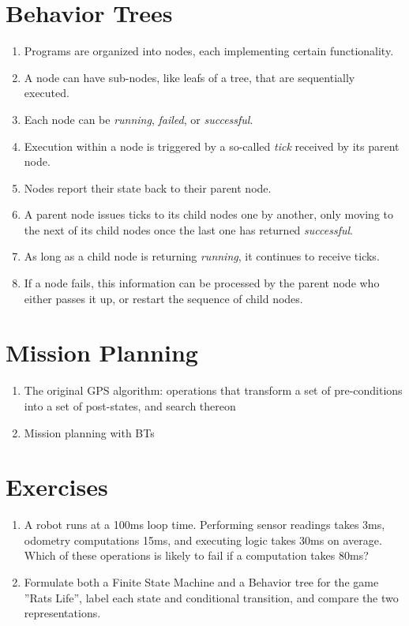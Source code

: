 \section{Behavior Trees}
\begin{enumerate}
\item Programs are organized into nodes, each implementing certain functionality.
\item A node can have sub-nodes, like leafs of a tree, that are sequentially executed.
\item Each node can be \emph{running}, \emph{failed}, or \emph{successful}.
\item Execution within a node is triggered by a so-called \emph{tick} received by its parent node.
\item Nodes report their state back to their parent node.
\item A parent node issues ticks to its child nodes one by another, only moving to the next of its child nodes once the last one has returned \emph{successful}.
\item As long as a child node is returning \emph{running}, it continues to receive ticks.
\item If a node fails, this information can be processed by the parent node who either passes it up, or restart the sequence of child nodes.
\end{enumerate}

\section{Mission Planning}
\begin{enumerate}
\item The original GPS algorithm: operations that transform a set of pre-conditions into a set of post-states, and search thereon
\item Mission planning with BTs
\end{enumerate}

\section{Exercises}

\begin{enumerate}
\item A robot runs at a 100ms loop time. Performing sensor readings takes 3ms, odometry computations 15ms, and executing logic takes 30ms on average. Which of these operations is likely to fail if a computation takes 80ms?
\item Formulate both a Finite State Machine and a Behavior tree for the game ''Rats Life'', label each state and conditional transition, and compare the two representations.
\end{enumerate}
